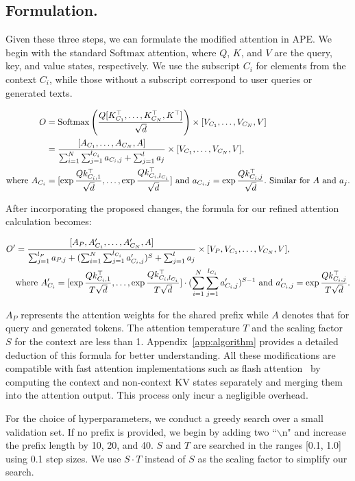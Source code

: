 \subsection{Formulation.}

Given these three steps, we can formulate the modified attention in APE. We begin with the standard $\mathrm{Softmax}$ attention, where $Q$, $K$, and $V$ are the query, key, and value states, respectively. We use the subscript ${C_i}$ for elements from the context ${C_i}$, while those without a subscript correspond to user queries or generated texts.

\begin{align}
O &= \mathrm{Softmax}\left(\frac{Q[K_{C_1}^\top, \ldots, K_{C_N}^\top, K^\top]}{\sqrt{d}}\right) \times [V_{C_1}, \ldots, V_{C_N}, V] \\
&= \frac{ [A_{C_1}, \ldots, A_{C_N}, A]}{\sum_{i=1}^{N}\sum_{j=1}^{l_{C_i}}a_{C_{i}, j}+ \sum_{j=1}^{l}a_{j}}\times [V_{C_1}, \ldots, V_{C_N}, V], \\
\text{where }A_{C_i} &= [\exp \frac{Qk_{C_i, 1}^\top}{\sqrt{d}}, \ldots, \exp \frac{Qk_{C_i, l_{C_i}}^\top}{\sqrt{d}}]\text{ and }a_{C_{i}, j} = \exp\frac{Qk_{C_i, j}^\top}{\sqrt{d}}.\text{ Similar for }A\text{ and }a_{j}.\notag
\end{align}

After incorporating the proposed changes, the formula for our refined attention calculation becomes:

\begin{align}
\label{algo:ape}
    O' &= \frac{[A_{P}, A'_{C_1}, \ldots, A'_{C_N}, A]}{\sum_{j=1}^{l_P}a_{P, j} + (\sum_{i=1}^{N}\sum_{j=1}^{l_{C_i}}a'_{C_i, j})^{S}+ \sum_{j=1}^{l}a_{j}}\times [V_P, V_{C_1}, \ldots, V_{C_{N}}, V], \\
    &\text{where }A'_{C_i} = [ \exp \frac{Qk_{C_i, 1}^\top}{T\sqrt{d}}, \ldots,  \exp \frac{Qk_{C_i, l_{C_i}}^\top}{T\sqrt{d}}] \cdot (\sum_{i=1}^{N}\sum_{j=1}^{l_{C_i}}a'_{C_i, j})^{S-1}\text{ and }a'_{C_{i}, j} = \exp\frac{Qk_{C_i, j}^\top}{T\sqrt{d}}.\notag
\end{align}

$A_P$ represents the attention weights for the shared prefix while $A$ denotes that for query and generated tokens. The attention temperature $T$ and the scaling factor $S$ for the context are less than 1. Appendix~\ref{app:algorithm} provides a detailed deduction of this formula for better understanding. All these modifications are compatible with fast attention implementations such as flash attention~\citep{dao2022flashattention} by computing the context and non-context KV states separately and merging them into the attention output. This process only incur a negligible overhead.

For the choice of hyperparameters, we conduct a greedy search over a small validation set. If no prefix is provided, we begin by adding two ``$\backslash$n" and increase the prefix length by 10, 20, and 40. $S$ and $T$ are searched in the ranges [0.1, 1.0] using 0.1 step sizes. We use $S\cdot T$ instead of $S$ as the scaling factor to simplify our search.
